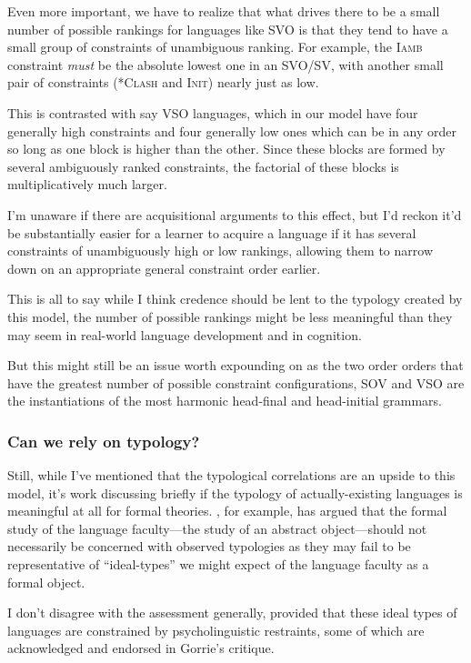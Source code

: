 \documentclass{article}
\newcommand{\noclash}{\textsc{*Clash}}
\newcommand{\iamb}{\textsc{Iamb}}
\newcommand{\initphi}{\textsc{Init\textphi}}
\begin{document}
Even more important, we have to realize that what drives there to be a small number of possible rankings for languages like SVO is that they tend to have a small group of constraints of unambiguous ranking.
For example, the \iamb{} constraint \emph{must} be the absolute lowest one in an SVO/SV, with another small pair of constraints (\noclash{} and \initphi) nearly just as low.

This is contrasted with say VSO languages, which in our model have four generally high constraints and four generally low ones which can be in any order so long as one block is higher than the other. Since these blocks are formed by several ambiguously ranked constraints, the factorial of these blocks is multiplicatively much larger.

I'm unaware if there are acquisitional arguments to this effect, but I'd reckon it'd be substantially easier for a learner to acquire a language if it has several constraints of unambiguously high or low rankings, allowing them to narrow down on an appropriate general constraint order earlier.

This is all to say while I think credence should be lent to the typology created by this model, the number of possible rankings might be less meaningful than they may seem in real-world language development and in cognition.

But this might still be an issue worth expounding on as the two order orders that have the greatest number of possible constraint configurations, SOV and VSO are the instantiations of the most harmonic head-final and head-initial grammars.

\subsubsection{Can we rely on typology?\label{type}}

Still, while I've mentioned that the typological correlations are an upside to this model, it's work discussing briefly if the typology of actually-existing languages is meaningful at all for formal theories. \textcite{gorrie14}, for example, has argued that the formal study of the language faculty---the study of an abstract object---should not necessarily be concerned with observed typologies as they may fail to be representative of ``ideal-types'' we might expect of the language faculty as a formal object.

I don't disagree with the assessment generally, provided that these ideal types of languages are constrained by psycholinguistic restraints, some of which \parencite{culbertson14} are acknowledged and endorsed in Gorrie's critique.
\end{document}
